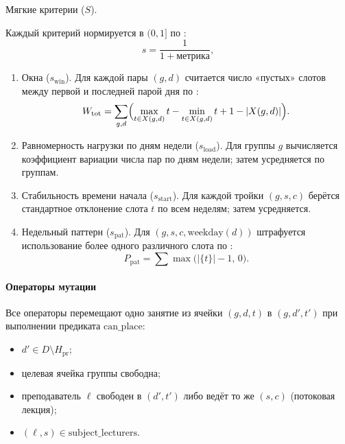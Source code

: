 Мягкие критерии ($S$).

Каждый критерий нормируется в $(0,1]$ по :
\begin{equation}
	s = \frac{1}{1+\text{метрика}},
	\label{eq:norm-soft}
\end{equation}
\begin{enumerate}
	\item Окна ($s_{\mathrm{win}}$).
	Для каждой пары $(g,d)$ считается число «пустых» слотов между
	первой и последней парой дня по :
	\begin{equation}
		W_{\mathrm{tot}}=
		\sum_{g,d}\Bigl(
		\max_{t\in X(g,d)} t-\min_{t\in X(g,d)} t+1-|X(g,d)|
		\Bigr).
		\label{eq:wfc-windows}
	\end{equation}

	\item Равномерность нагрузки по дням недели ($s_{\mathrm{load}}$).
	Для группы $g$ вычисляется коэффициент вариации числа пар
	по дням недели; затем усредняется по группам.

	\item Стабильность времени начала ($s_{\mathrm{start}}$).
	Для каждой тройки $(g,s,c)$ берётся стандартное отклонение слота $t$
	по всем неделям; затем усредняется.

	\item Недельный паттерн ($s_{\mathrm{pat}}$).
	Для $(g,s,c,\mathrm{weekday}(d))$ штрафуется использование
	более одного различного слота по :
	\begin{equation}
		P_{\mathrm{pat}}=
		\sum \max\bigl(|\{t\}|-1,\,0\bigr).
		\label{eq:wfc-pattern}
	\end{equation}
\end{enumerate}

\paragraph{Операторы мутации}

Все операторы перемещают одно занятие из ячейки $(g,d,t)$ в
$(g,d',t')$ при выполнении предиката $\mathrm{can\_place}$:
\begin{itemize}
	\item $d'\in D\setminus H_{\mathrm{pr}}$;
	\item целевая ячейка группы свободна;
	\item преподаватель $\ell$ свободен в $(d',t')$ либо ведёт то же
	$(s,c)$ (потоковая лекция);
	\item $(\ell,s)\in\mathrm{subject\_lecturers}$.
\end{itemize}

